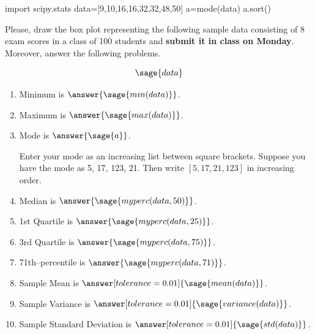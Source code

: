 \documentclass{ximera}
\begin{document}
\begin{problem}
\begin{sagesilent}
import scipy.stats
data=[9,10,16,16,32,32,48,50]
a=mode(data)
a.sort()
\end{sagesilent}
Please, draw the box plot representing the following sample data consisting of 8 exam scores in a class of 100 students and \textbf{submit it in class on Monday}. Moreover, answer the following problems.

$$\sage{data}$$

\begin{enumerate}
    \item Minimum is $\answer{\sage{min(data)}}$.
    \item Maximum is $\answer{\sage{max(data)}}$.
    \item Mode is $\answer{\sage{a}}$.
        \begin{hint}
        Enter your mode as an increasing list between square brackets. 
        Suppose you have the mode as 5, 17, 123, 21. Then write $[5, 17,21, 123]$ in increasing         order.
        \end{hint}
    \item Median is $\answer{\sage{myperc(data,50)}}$.
    \item 1st Quartile is $\answer{\sage{myperc(data,25)}}$.
    \item 3rd Quartile is $\answer{\sage{myperc(data,75)}}$.
    \item 71th--percentile is $\answer{\sage{myperc(data,71)}}$.
    \item Sample Mean is $\answer[tolerance=0.01]{\sage{mean(data)}}$.
    \item Sample Variance is $\answer[tolerance=0.01]{\sage{variance(data)}}$.
    \item Sample Standard Deviation is $\answer[tolerance=0.01]{\sage{std(data)}}$.
\end{enumerate}
\end{problem}
\end{document}

